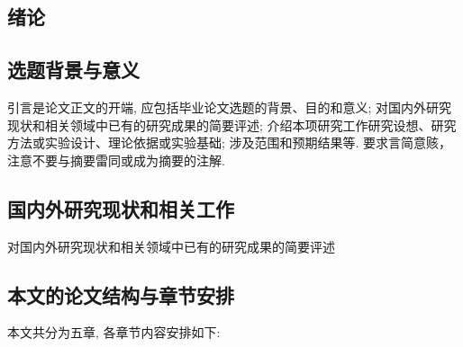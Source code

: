 \documentclass[a4paper]{article}
\begin{document}
\begin{spacing}{1.5}
\setcounter{page}{1}

\section{绪论}
\subsection{选题背景与意义}
\label{sec:background}
引言是论文正文的开端, 应包括毕业论文选题的背景、目的和意义; 对国内外研究现状和相关领域中已有的研究成果的简要评述; 介绍本项研究工作研究设想、研究方法或实验设计、理论依据或实验基础; 涉及范围和预期结果等. 要求言简意赅，注意不要与摘要雷同或成为摘要的注解.

\subsection{国内外研究现状和相关工作}
\label{sec:related_work}
对国内外研究现状和相关领域中已有的研究成果的简要评述

\subsection{本文的论文结构与章节安排}
\label{sec:arrangement}
本文共分为五章, 各章节内容安排如下:


\end{spacing}
\end{document}

